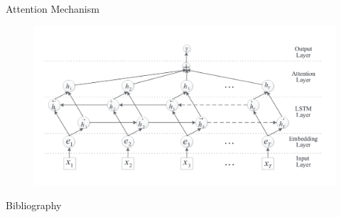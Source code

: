 \documentclass{beamer}
\begin{document}
	\begin{frame}[allowframebreaks]{Attention Mechanism}
		\begin{figure}
		 \includegraphics[scale=0.25]{attention}
	\end{figure}
	\note{}
	\end{frame}
  \begin{frame}[allowframebreaks]{Bibliography}
    
	
	\note{}
  \end{frame}
\end{document}
